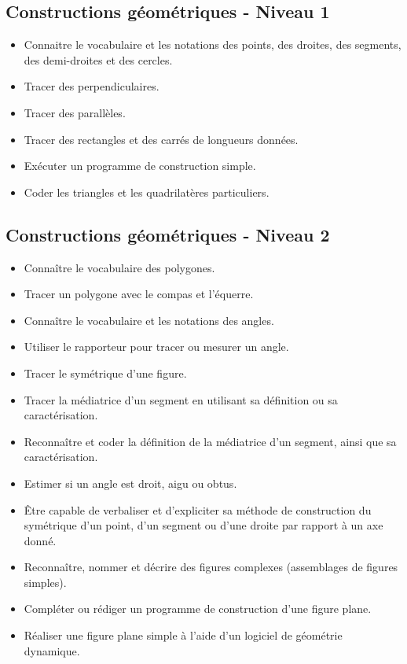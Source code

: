 \documentclass[a4paper,12pt,fleqn]{article}		
\begin{document}
\renewcommand{\labelitemi}{}

\subsection*{Constructions géométriques - Niveau 1}

\begin{itemize}
	\item {}Connaitre le vocabulaire et les notations des points, des droites, des segments, des demi-droites et des cercles. 
	\item {}Tracer des perpendiculaires.
	\item {}Tracer des parallèles.
	\item {}Tracer des rectangles et des carrés de longueurs données.
	\item {}Exécuter un programme de construction simple.
	\item {}Coder les triangles et les quadrilatères particuliers.
\end{itemize}

\subsection*{Constructions géométriques - Niveau 2}

\begin{itemize}
	\item {}Connaître le vocabulaire des polygones.
	\item {}Tracer un polygone avec le compas et l’équerre.
	\item {}Connaître le vocabulaire et les notations des angles.
	\item {}Utiliser le rapporteur pour tracer ou mesurer un angle.
	\item {}Tracer le symétrique d’une figure.
	\item {}Tracer la médiatrice d’un segment en utilisant sa définition ou sa caractérisation.
	\item {}Reconnaître et coder la définition de la médiatrice d’un segment, ainsi que sa caractérisation.
	\item {}Estimer si un angle est droit, aigu ou obtus.
	\item {}Être capable de verbaliser et d’expliciter sa méthode de construction du symétrique d’un point, d’un segment ou d’une droite par rapport à un axe donné.
	\item {}Reconnaître, nommer et décrire des figures complexes (assemblages de figures simples).
	\item {}Compléter ou rédiger un programme de construction d’une figure plane.
	\item {}Réaliser une figure plane simple à l’aide d’un logiciel de géométrie dynamique.
\end{itemize}
\end{document}
